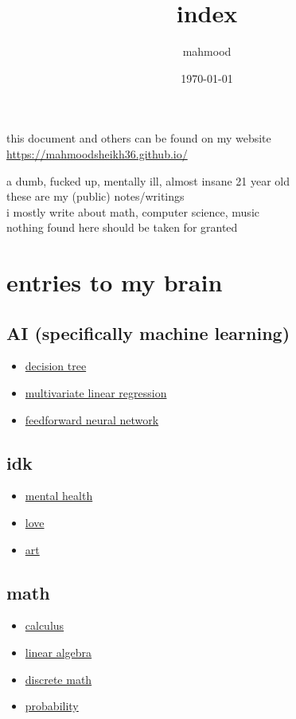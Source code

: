 \documentclass[a4paper,12pt]{article}
\author{mahmood}
\date{\today}
\title{index}
\begin{document}
\maketitle
\begin{note}
this document and others can be found on my website\\
\url{https://mahmoodsheikh36.github.io/}
\end{note}
a dumb, fucked up, mentally ill, almost insane 21 year old\\
these are my (public) notes/writings\\
i mostly write about math, computer science, music\\
nothing found here should be taken for granted\\
\section{entries to my brain}
\label{sec:org7aaeccf}
\subsection{AI (specifically machine learning)}
\label{sec:org21bee71}
\begin{itemize}
\item \href{20230225234245-decision_tree.org}{decision tree}\\
\item \href{20230420204808-multivariate_linear_regression.org}{multivariate linear regression}\\
\item \href{20230502235623-feedforward_neural_network.org}{feedforward neural network}\\
\end{itemize}
\subsection{idk}
\label{sec:orgdd9b59f}
\begin{itemize}
\item \href{mental_health.org}{mental health}\\
\item \href{20220701191204-love.org}{love}\\
\item \href{art.org}{art}\\
\end{itemize}
\subsection{math}
\label{sec:org5ed05c2}
\begin{itemize}
\item \href{calculus2.org}{calculus}\\
\item \href{linear_algebra2.org}{linear algebra}\\
\item \href{discrete_maths2.org}{discrete math}\\
\item \href{probability.org}{probability}\\
\end{itemize}
\end{document}
